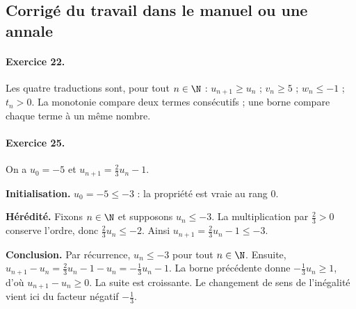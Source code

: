 \subsection{Corrigé du travail dans le manuel ou une annale}\paragraph{Exercice 22.} Les quatre traductions sont, pour tout $n\in\N$ : $u_{n+1}\ge u_n$ ; $v_n\ge5$ ; $w_n\le-1$ ; $t_n>0$. La monotonie compare deux termes consécutifs ; une borne compare chaque terme à un même nombre.
\paragraph{Exercice 25.} On a $u_0=-5$ et $u_{n+1}=\frac23u_n-1$.
\par\smallskip\textbf{Initialisation.} $u_0=-5\le-3$ : la propriété est vraie au rang $0$.
\par\smallskip\textbf{Hérédité.} Fixons $n\in\N$ et supposons $u_n\le-3$. La multiplication par $\frac23>0$ conserve l'ordre, donc $\frac23u_n\le-2$. Ainsi $u_{n+1}=\frac23u_n-1\le-3$.
\par\smallskip\textbf{Conclusion.} Par récurrence, $u_n\le-3$ pour tout $n\in\N$.
Ensuite, $u_{n+1}-u_n=\frac23u_n-1-u_n=-\frac13u_n-1$. La borne précédente donne $-\frac13u_n\ge1$, d'où $u_{n+1}-u_n\ge0$. La suite est croissante. Le changement de sens de l'inégalité vient ici du facteur négatif $-\frac13$.

\fi

